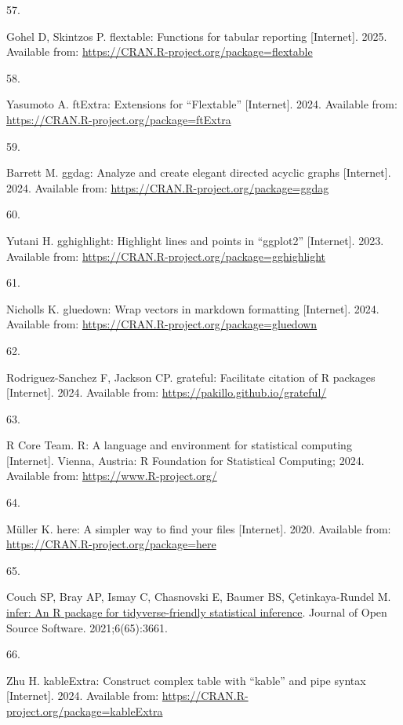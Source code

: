 \documentclass[
]{article}
\newlength{\cslhangindent}
\newlength{\csllabelwidth}
\newenvironment{CSLReferences}[2] %
 {\begin{list}{}{%
  \setlength{\itemindent}{0pt}
  \setlength{\leftmargin}{0pt}
  \setlength{\parsep}{0pt}
  \ifodd #1
   \setlength{\leftmargin}{\cslhangindent}
   \setlength{\itemindent}{-1\cslhangindent}
  \fi
  \setlength{\itemsep}{#2\baselineskip}}}
 {\end{list}}
\newcommand{\CSLLeftMargin}[1]{\parbox[t]{\csllabelwidth}{\strut#1\strut}}
\newcommand{\CSLRightInline}[1]{\parbox[t]{\linewidth - \csllabelwidth}{\strut#1\strut}}
\begin{document}
\begin{CSLReferences}{0}{1}
\CSLLeftMargin{57. }%
\CSLRightInline{Gohel D, Skintzos P. {flextable}: Functions for tabular reporting {[}Internet{]}. 2025. Available from: \url{https://CRAN.R-project.org/package=flextable}}

\CSLLeftMargin{58. }%
\CSLRightInline{Yasumoto A. {ftExtra}: Extensions for {``{Flextable}''} {[}Internet{]}. 2024. Available from: \url{https://CRAN.R-project.org/package=ftExtra}}

\CSLLeftMargin{59. }%
\CSLRightInline{Barrett M. {ggdag}: Analyze and create elegant directed acyclic graphs {[}Internet{]}. 2024. Available from: \url{https://CRAN.R-project.org/package=ggdag}}

\CSLLeftMargin{60. }%
\CSLRightInline{Yutani H. {gghighlight}: Highlight lines and points in {``{ggplot2}''} {[}Internet{]}. 2023. Available from: \url{https://CRAN.R-project.org/package=gghighlight}}

\CSLLeftMargin{61. }%
\CSLRightInline{Nicholls K. {gluedown}: Wrap vectors in markdown formatting {[}Internet{]}. 2024. Available from: \url{https://CRAN.R-project.org/package=gluedown}}

\CSLLeftMargin{62. }%
\CSLRightInline{Rodriguez-Sanchez F, Jackson CP. {grateful}: Facilitate citation of {R} packages {[}Internet{]}. 2024. Available from: \url{https://pakillo.github.io/grateful/}}

\CSLLeftMargin{63. }%
\CSLRightInline{R Core Team. {R}: A language and environment for statistical computing {[}Internet{]}. Vienna, Austria: R Foundation for Statistical Computing; 2024. Available from: \url{https://www.R-project.org/}}

\CSLLeftMargin{64. }%
\CSLRightInline{Müller K. {here}: A simpler way to find your files {[}Internet{]}. 2020. Available from: \url{https://CRAN.R-project.org/package=here}}

\CSLLeftMargin{65. }%
\CSLRightInline{Couch SP, Bray AP, Ismay C, Chasnovski E, Baumer BS, Çetinkaya-Rundel M. \href{https://doi.org/10.21105/joss.03661}{{infer}: An {R} package for tidyverse-friendly statistical inference}. Journal of Open Source Software. 2021;6(65):3661. }

\CSLLeftMargin{66. }%
\CSLRightInline{Zhu H. {kableExtra}: Construct complex table with {``{kable}''} and pipe syntax {[}Internet{]}. 2024. Available from: \url{https://CRAN.R-project.org/package=kableExtra}}


\end{CSLReferences}
\end{document}
